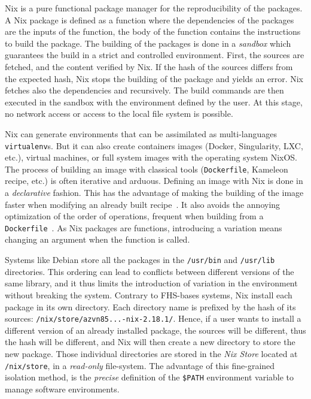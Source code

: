 \documentclass[sigconf,natbib=false]{acmart}
\begin{document}
Nix is a pure functional package manager for the reproducibility of the packages.
A Nix package is defined as a function where the dependencies of the packages are the inputs of the function, the body of the function contains the instructions to build the package.
The building of the packages is done in a \emph{sandbox} which guarantees the build in a strict and controlled environment.
First, the sources are fetched, and the content verified by Nix.
If the hash of the sources differs from the expected hash, Nix stops the building of the package and yields an error.
Nix fetches also the dependencies and recursively.
The build commands are then executed in the sandbox with the environment defined by the user.
At this stage, no network access or access to the local file system is possible.


Nix can generate environments that can be assimilated as multi-languages \texttt{virtualenv}s.
But it can also create containers images (Docker, Singularity, LXC, etc.), virtual machines, or full system images with the operating system NixOS.
The process of building an image with classical tools (\texttt{Dockerfile}, Kameleon recipe, etc.) is often iterative and arduous.
Defining an image with Nix is done in a \emph{declarative} fashion.
This has the advantage of making the building of the image faster when modifying an already built recipe\ \cite{nxc}.
It also avoids the annoying optimization of the order of operations, frequent when building from a \texttt{Dockerfile}\ \cite{docker_cache}. 
As Nix packages are functions, introducing a variation means changing an argument when the function is called.

Systems like Debian store all the packages in the \texttt{/usr/bin} and \texttt{/usr/lib} directories.
This ordering can lead to conflicts between different versions of the same library, and it thus limits the introduction of variation in the environment without breaking the system.
Contrary to FHS-bases systems, Nix install each package in its own directory.
Each directory name is prefixed by the hash of its sources: \texttt{/nix/store/azvn85...-nix-2.18.1/}.
Hence, if a user wants to install a different version of an already installed package, the sources will be different, thus the hash will be different, and Nix will then create a new directory to store the new package.
Those individual directories are stored in the \emph{Nix Store} located at \texttt{/nix/store}, in a \emph{read-only} file-system.
The advantage of this fine-grained isolation method, is the \emph{precise} definition of the \texttt{\$PATH} environment variable to manage software environments.
\end{document}
